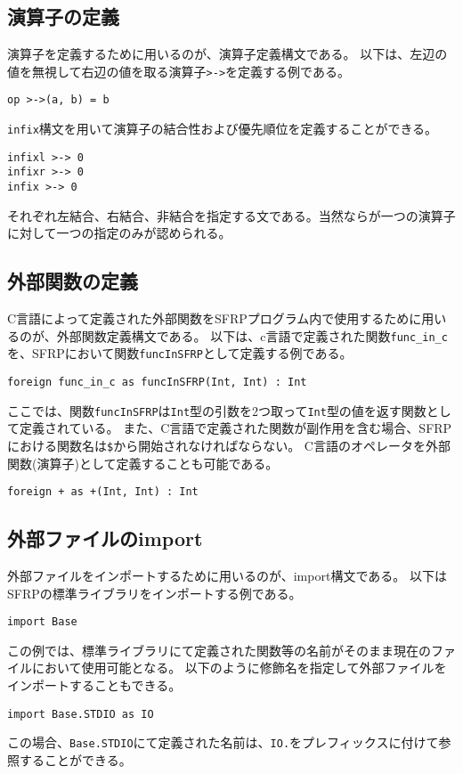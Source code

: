 \subsection{演算子の定義}
演算子を定義するために用いるのが、演算子定義構文である。
以下は、左辺の値を無視して右辺の値を取る演算子\texttt{>->}を定義する例である。
\begin{lstlisting}[basicstyle=\ttfamily\small,language=SFRP]
op >->(a, b) = b
\end{lstlisting}
\texttt{infix}構文を用いて演算子の結合性および優先順位を定義することができる。
\begin{lstlisting}[basicstyle=\ttfamily\small,language=SFRP]
infixl >-> 0
infixr >-> 0
infix >-> 0
\end{lstlisting}
それぞれ左結合、右結合、非結合を指定する文である。当然ならが一つの演算子に対して一つの指定のみが認められる。

\subsection{外部関数の定義}
C言語によって定義された外部関数をSFRPプログラム内で使用するために用いるのが、外部関数定義構文である。
以下は、c言語で定義された関数\texttt{func\_in\_c}を、SFRPにおいて関数\texttt{funcInSFRP}として定義する例である。
\begin{lstlisting}[basicstyle=\ttfamily\small,language=SFRP]
foreign func_in_c as funcInSFRP(Int, Int) : Int
\end{lstlisting}
ここでは、関数\texttt{funcInSFRP}は\texttt{Int}型の引数を2つ取って\texttt{Int}型の値を返す関数として定義されている。
また、C言語で定義された関数が副作用を含む場合、SFRPにおける関数名は\texttt{\$}から開始されなければならない。
C言語のオペレータを外部関数(演算子)として定義することも可能である。
\begin{lstlisting}[basicstyle=\ttfamily\small,language=SFRP]
foreign + as +(Int, Int) : Int
\end{lstlisting}

\subsection{外部ファイルのimport}
外部ファイルをインポートするために用いるのが、import構文である。
以下はSFRPの標準ライブラリをインポートする例である。
\begin{lstlisting}[basicstyle=\ttfamily\small,language=SFRP]
import Base
\end{lstlisting}
この例では、標準ライブラリにて定義された関数等の名前がそのまま現在のファイルにおいて使用可能となる。
以下のように修飾名を指定して外部ファイルをインポートすることもできる。
\begin{lstlisting}[basicstyle=\ttfamily\small,language=SFRP]
import Base.STDIO as IO
\end{lstlisting}
この場合、\texttt{Base.STDIO}にて定義された名前は、\texttt{IO.}をプレフィックスに付けて参照することができる。

